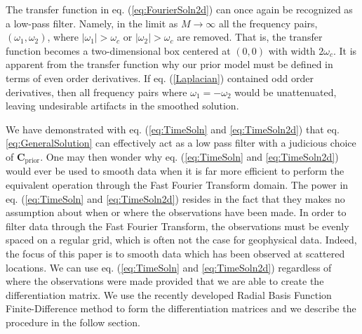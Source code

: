 \documentclass[10pt,a4paper]{article}
\begin{document}
The transfer function in eq. (\ref{eq:FourierSoln2d}) can once again be recognized as a low-pass filter.  Namely, in the limit as $M \to \infty$ all the frequency pairs, $(\omega_1,\omega_2)$, where $|\omega_1| > \omega_c$ or $|\omega_2| > \omega_c$ are removed.  That is, the transfer function becomes a two-dimensional box centered at $(0,0)$ with width $2\omega_c$.  It is apparent from the transfer function why our prior model must be defined in terms of even order derivatives.  If eq. (\ref{Laplacian}) contained odd order derivatives, then all frequency pairs where $\omega_1=-\omega_2$ would be unattenuated, leaving undesirable artifacts in the smoothed solution.

We have demonstrated with eq. (\ref{eq:TimeSoln} and \ref{eq:TimeSoln2d}) that eq. \ref{eq:GeneralSolution} can effectively act as a low pass filter with a judicious choice of $\mathbf{C}_\mathrm{prior}$.  One may then wonder why eq. (\ref{eq:TimeSoln} and \ref{eq:TimeSoln2d}) would ever be used to smooth data when it is far more efficient to perform the equivalent operation through the Fast Fourier Transform domain.  The power in eq. (\ref{eq:TimeSoln} and \ref{eq:TimeSoln2d}) resides in the fact that they makes no assumption about when or where the observations have been made.  In order to filter data through the Fast Fourier Transform, the observations must be evenly spaced on a regular grid, which is often not the case for geophysical data.  Indeed,  the focus of this paper is to smooth data which has been observed at scattered locations.  We can use eq. (\ref{eq:TimeSoln} and \ref{eq:TimeSoln2d}) regardless of where the observations were made provided that we are able to create the differentiation matrix.  We use the recently developed Radial Basis Function Finite-Difference method to form the differentiation matrices and we describe the procedure in the follow section.  

 
\end{document}
